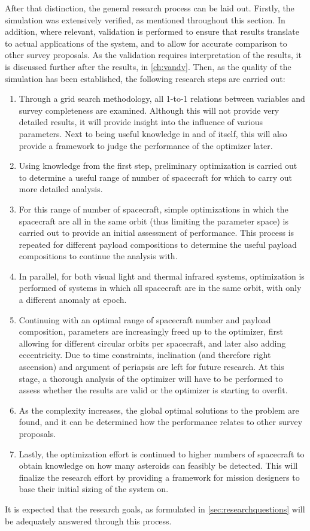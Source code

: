After that distinction, the general research process can be laid out. Firstly, the simulation was extensively verified, as mentioned throughout this section. In addition, where relevant, validation is performed to ensure that results translate to actual applications of the system, and to allow for accurate comparison to other survey proposals. As the validation requires interpretation of the results, it is discussed further after the results, in \autoref{ch:vandv}. Then, as the quality of the simulation has been established, the following research steps are carried out:
\begin{enumerate}
 \item Through a grid search methodology, all 1-to-1 relations between variables and survey completeness are examined. Although this will not provide very detailed results, it will provide insight into the influence of various parameters. Next to being useful knowledge in and of itself, this will also provide a framework to judge the performance of the optimizer later.
 \item Using knowledge from the first step, preliminary optimization is carried out to determine a useful range of number of spacecraft for which to carry out more detailed analysis.
 \item For this range of number of spacecraft, simple optimizations in which the spacecraft are all in the same orbit (thus limiting the parameter space) is carried out to provide an initial assessment of performance. This process is repeated for different payload compositions to determine the useful payload compositions to continue the analysis with.
 \item In parallel, for both visual light and thermal infrared systems, optimization is performed of systems in which all spacecraft are in the same orbit, with only a different anomaly at epoch.
 \item Continuing with an optimal range of spacecraft number and payload composition, parameters are increasingly freed up to the optimizer, first allowing for different circular orbits per spacecraft, and later also adding eccentricity. Due to time constraints, inclination (and therefore right ascension) and argument of periapsis are left for future research. At this stage, a thorough analysis of the optimizer will have to be performed to assess whether the results are valid or the optimizer is starting to overfit.
 \item As the complexity increases, the global optimal solutions to the problem are found, and it can be determined how the performance relates to other survey proposals.
 \item Lastly, the optimization effort is continued to higher numbers of spacecraft to obtain knowledge on how many asteroids can feasibly be detected. This will finalize the research effort by providing a framework for mission designers to base their initial sizing of the system on.
\end{enumerate}
It is expected that the research goals, as formulated in \autoref{sec:researchquestions} will be adequately answered through this process.

